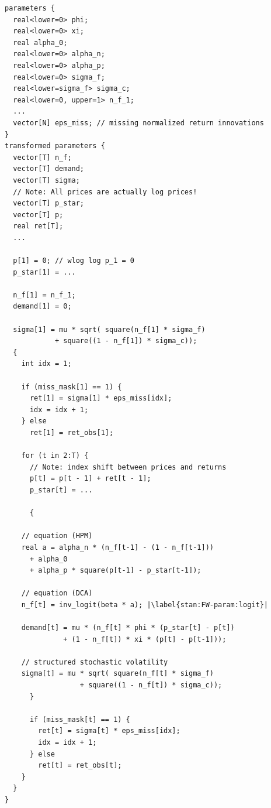 \documentclass[ngerman]{ttlab-qualify}
\begin{document}
\begin{lstlisting}[style=custom, escapechar=|,caption={Teil-Modell nach \parencite{bertschinger:2018, FW:2011}},label={stan:FW-param}]
parameters {
  real<lower=0> phi;
  real<lower=0> xi;
  real alpha_0;
  real<lower=0> alpha_n;
  real<lower=0> alpha_p;
  real<lower=0> sigma_f;
  real<lower=sigma_f> sigma_c;
  real<lower=0, upper=1> n_f_1;
  ...
  vector[N] eps_miss; // missing normalized return innovations
}
transformed parameters {
  vector[T] n_f;
  vector[T] demand;
  vector[T] sigma;
  // Note: All prices are actually log prices!
  vector[T] p_star;
  vector[T] p;
  real ret[T];
  ...
  
  p[1] = 0; // wlog log p_1 = 0
  p_star[1] = ...
  
  n_f[1] = n_f_1;
  demand[1] = 0;
  
  sigma[1] = mu * sqrt( square(n_f[1] * sigma_f)
			+ square((1 - n_f[1]) * sigma_c));
  {
    int idx = 1;
    
    if (miss_mask[1] == 1) {
      ret[1] = sigma[1] * eps_miss[idx];
      idx = idx + 1;
    } else
      ret[1] = ret_obs[1];

    for (t in 2:T) {
      // Note: index shift between prices and returns
      p[t] = p[t - 1] + ret[t - 1];
      p_star[t] = ...

      {
	
    // equation (HPM)
	real a = alpha_n * (n_f[t-1] - (1 - n_f[t-1]))
	  + alpha_0
	  + alpha_p * square(p[t-1] - p_star[t-1]);
	
    // equation (DCA)
	n_f[t] = inv_logit(beta * a); |\label{stan:FW-param:logit}|
	
    demand[t] = mu * (n_f[t] * phi * (p_star[t] - p[t])
			  + (1 - n_f[t]) * xi * (p[t] - p[t-1]));
	
    // structured stochastic volatility
	sigma[t] = mu * sqrt( square(n_f[t] * sigma_f)
			      + square((1 - n_f[t]) * sigma_c));
      }
      
      if (miss_mask[t] == 1) {
        ret[t] = sigma[t] * eps_miss[idx];
        idx = idx + 1;
      } else
        ret[t] = ret_obs[t];
    }
  }
}
\end{lstlisting}
\end{document}
